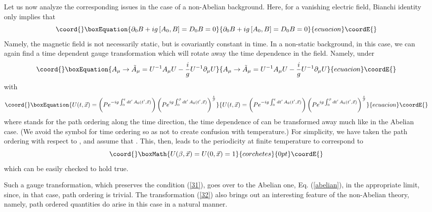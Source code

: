 \documentclass[a4paper,12pt]{article}
\begin{document}
Let us now analyze the corresponding issues in the case of a
non-Abelian background. Here, for a vanishing electric field, Bianchi
identity only implies that
\begin{equation}\coord{}\boxEquation{
\partial_{0}B + ig \left[A_{0},B\right] = D_{0}B = 0\label{31}
}{
\partial_{0}B + ig \left[A_{0},B\right] = D_{0}B = 0}{ecuacion}\coordE{}\end{equation}
Namely, the magnetic field is not necessarily static, but is
covariantly constant in time. In a
non-static background, in this case, we can again find a time
dependent  gauge transformation which will rotate away the time
dependence in the \coordHE{} field. Namely, under
\begin{equation}\coord{}\boxEquation{
A_{\mu}\rightarrow \tilde{A}_{\mu} = U^{-1}A_{\mu}U - {i\over g}
U^{-1}\partial_{\mu}U 
}{
A_{\mu}\rightarrow \tilde{A}_{\mu} = U^{-1}A_{\mu}U - {i\over g}
U^{-1}\partial_{\mu}U 
}{ecuacion}\coordE{}\end{equation}
with
\begin{equation}\coord{}\boxEquation{
U(t, \vec{x}) = \left(P e^{-ig\int_{0}^{t}
    dt'\,A_{0}(t',\vec{x})}\right)\left(P e^{ig\int_{0}^{\beta}
    dt'\,A_{0}(t',\vec{x})}\right)^{{t\over\beta}}\label{32}
}{
U(t, \vec{x}) = \left(P e^{-ig\int_{0}^{t}
    dt'\,A_{0}(t',\vec{x})}\right)\left(P e^{ig\int_{0}^{\beta}
    dt'\,A_{0}(t',\vec{x})}\right)^{{t\over\beta}}}{ecuacion}\coordE{}\end{equation}
where \coordHE{} stands for the path ordering along the time
direction, the time dependence of \coordHE{} can be
transformed away 
much like in the Abelian case. (We avoid the symbol \coordHE{} for time
ordering so as not to create confusion with temperature.) For
simplicity, we have taken the path ordering with respect to \coordHE{},
and assume that \coordHE{}.
This, then, leads to the periodicity at finite temperature to
correspond to
\[\coord{}\boxMath{
U(\beta,\vec{x}) = U(0,\vec{x}) = 1
}{corchetes}{0pt}\coordE{}\]
which can be easily checked to hold true. 

Such a gauge transformation, which preserves the condition (\ref{31}), goes
over to the Abelian one, Eq. (\ref{abelian}), in the appropriate
limit, since, in that case, path ordering is trivial. The
transformation (\ref{32})  also brings
out an interesting feature of the non-Abelian theory, namely, path
ordered quantities \cite{Polyakov:1987ez} do arise in this case in a
natural manner. 
\end{document}
